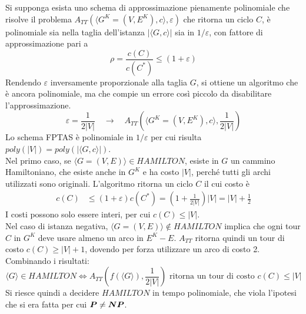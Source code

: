 Si supponga esista uno schema di approssimazione pienamente polinomiale che risolve il problema $
A_{TT} \left( 
    \langle
        G^K = (V,E^K), c
    \rangle
    , \varepsilon
\right)
$ che ritorna un ciclo $C$, è polinomiale sia nella taglia dell'istanza $|
    \langle
        G, c
    \rangle
|$ sia in $1/\varepsilon$, con fattore di approssimazione pari a
\begin{equation*}
    \rho = 
    \frac{
        c \left( C \right)
    }{
        c \left( C^* \right)
    }
    \leq \left( 1+\varepsilon \right)
\end{equation*}
Rendendo $\varepsilon$ inversamente proporzionale alla taglia $G$, si ottiene un algoritmo che è ancora polinomiale, ma che compie un errore così piccolo da disabilitare l'approssimazione.
\begin{equation*}
    \varepsilon = 
    \frac{1}{2|V|}
    \quad
    \to
    \quad
    A_{TT} \left( 
        \langle
            G^K = (V,E^K), c
        \rangle
        ,
        \frac{1}{2|V|}
    \right)
\end{equation*}
Lo schema FPTAS è polinomiale in $1/\varepsilon$ per cui risulta $poly(|V|) = poly (|
\langle
G,c
\rangle 
|)
$.
\\
Nel primo caso, se $ \langle G = (V,E) \rangle \in HAMILTON$, esiste in $G$ un cammino Hamiltoniano, che esiste anche in $G^K$ e ha costo $|V|$, perché tutti gli archi utilizzati sono originali.
L'algoritmo ritorna un ciclo $C$ il cui costo è
\begin{align*}
    c(C) 
    &
    \leq
    \left( 1 + \varepsilon \right)
    c(C^*)
    =
    \left( 1 +
        \frac{1}{2|V|}
    \right)
    |V|
    = |V| + \frac{1}{2}
\end{align*}
I costi possono solo essere interi, per cui 
$
c(C) \leq |V|
$.
\\
Nel caso di istanza negativa, $
\langle G = (V,E) \rangle \notin HAMILTON
$ implica che ogni tour $C$ in $G^K$ deve usare almeno un arco in $E^K-E$.
$A_{TT}$ ritorna quindi un tour di costo 
$
c(C) \geq |V| + 1
$, dovendo per forza utilizzare un arco di costo 2.
\\
Combinando i risultati:
\begin{equation*}
    \langle G \rangle \in HAMILTON
    \Leftrightarrow
    A_{TT}
    \left( 
        f ( \langle G \rangle)
        ,
        \frac{1}{2|V|}
    \right)
    \text{ ritorna un tour di costo } c(C) \leq |V|
\end{equation*}
Si riesce quindi a decidere $HAMILTON$ in tempo polinomiale, che viola l'ipotesi che si era fatta per cui
$\bm{P} \neq \bm{NP}$.

